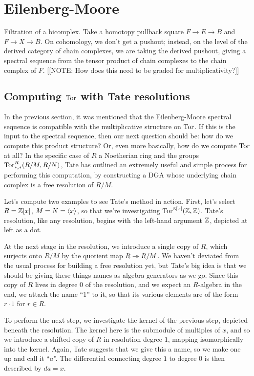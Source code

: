 \chapter{Eilenberg-Moore}

Filtration of a bicomplex.  Take a homotopy pullback square $F \to E \to B$ and $F \to X \to B$.  On cohomology, we don't get a pushout; instead, on the level of the derived category of chain complexes, we are taking the derived pushout, giving a spectral sequence from the tensor product of chain complexes to the chain complex of $F$. [[NOTE: How does this need to be graded for multiplicativity?]]

\section{Computing $\operatorname{Tor}$ with Tate resolutions}

In the previous section, it was mentioned that the Eilenberg-Moore spectral sequence is compatible with the multiplicative structure on $\operatorname{Tor}$.  If this is the input to the spectral sequence, then our next question should be: how do we compute this product structure?  Or, even more basically, how do we compute $\operatorname{Tor}$ at all?  In the specific case of $R$ a Noetherian ring and the groups $\operatorname{Tor}^R_{*, *}(R/M, R/N)$, Tate has outlined an extremely useful and simple process for performing this computation, by constructing a DGA whose underlying chain complex is a free resolution of $R/M$.

Let's compute two examples to see Tate's method in action.  First, let's select $R = \mathbb{Z}[x]$, $M = N = \langle x\rangle$, so that we're investigating $\operatorname{Tor}^{\mathbb{Z}[x]}(\mathbb{Z}, \mathbb{Z})$.  Tate's resolution, like any resolution, begins with the left-hand argument $\mathbb{Z}$, depicted at left as a dot.

At the next stage in the resolution, we introduce a single copy of $R$, which surjects onto $R/M$ by the quotient map $R \twoheadrightarrow R/M$.  We haven't deviated from the usual process for building a free resolution yet, but Tate's big idea is that we should be giving these things names as algebra generators as we go.  Since this copy of $R$ lives in degree $0$ of the resolution, and we expect an $R$-algebra in the end, we attach the name ``$1$'' to it, so that its various elements are of the form $r \cdot 1$ for $r \in R$.

To perform the next step, we investigate the kernel of the previous step, depicted beneath the resolution.  The kernel here is the submodule of multiples of $x$, and so we introduce a shifted copy of $R$ in resolution degree $1$, mapping isomorphically into the kernel.  Again, Tate suggests that we give this a name, so we make one up and call it ``$a$''.  The differential connecting degree $1$ to degree $0$ is then described by $da = x$.

